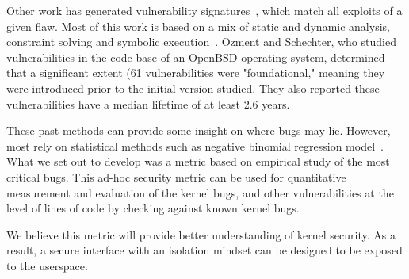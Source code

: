 Other work has generated vulnerability
signatures~\cite{brumley2006towards}, which match all exploits
of a given flaw. Most of this work is based on a mix of static and
dynamic analysis, constraint solving and symbolic execution~\cite{chou2003static}.
Ozment and Schechter, who studied vulnerabilities in the code base of an OpenBSD
operating system, determined that a significant extent (61%
vulnerabilities were "foundational," meaning they were introduced prior to the
initial version studied. They also reported these vulnerabilities
have a median lifetime of at least 2.6
years.

These past methods can provide some insight on where bugs may lie.
However, most rely on statistical methods such as
negative binomial regression model~\cite{Bug-Location}. What we set out to
develop was a metric based on empirical study of
the most critical bugs. This ad-hoc security metric can be used for
quantitative measurement and evaluation of the kernel bugs,
and other vulnerabilities at the level of lines of code by checking against
known kernel bugs.

We believe this metric will provide better understanding of kernel security.
As a result, a secure interface with an isolation mindset can be designed
to be exposed to the userspace.




